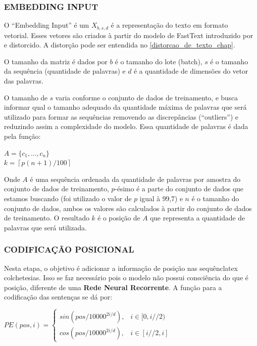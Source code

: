 \subsubsection{EMBEDDING INPUT}

O “Embedding Input” é um \textbf{$X_{b,s,d}$} é a representação do texto em formato vetorial. Esses vetores são criados à partir do modelo de FastText introduzido por \cite{fasttext} e distorcido. A distorção pode ser entendida no \autoref{distorcao_de_texto_chap}.

O tamanho da matriz é dados por \textbf{$b$} é o tamanho do lote (batch), \textbf{$s$} é o tamanho da sequência (quantidade de palavras) e \textbf{$d$} é a quantidade de dimensões do vetor das palavras.

O tamanho de \textbf{$s$} varia conforme o conjunto de dados de treinamento, e busca informar qual o tamanho adequado da quantidade máxima de palavras que será utilizado para formar as sequências removendo as discrepâncias (“outliers”) e reduzindo assim a complexidade do modelo. Essa quantidade de palavras é dada pela função:

\begin{center}
    $A = \{c_1, ..., c_n\}$ \\
    $k = \left \lceil p(n+1) / 100 \right \rceil$
\end{center}

Onde $A$ é uma sequência ordenada da quantidade de palavras por amostra do conjunto de dados de treinamento, $p$-ésimo é a parte  do conjunto de dados que estamos buscando (foi utilizado o valor de $p$ igual à 99,7) e $n$ é o tamanho do conjunto de dados, ambos os valores são calculados à partir do conjunto de dados de treinamento. O resultado $k$ é o posição de $A$ que representa a quantidade de palavras que será utilizada.

\subsubsection{CODIFICAÇÃO POSICIONAL}

Nesta etapa, o objetivo é adicionar a informação de posição nas sequênclatex colchetesias. Isso se faz necessário pois o modelo não possui consciência do que é posição, diferente de uma \textbf{Rede Neural Recorrente}. A função para a codificação das sentenças se dá por:

\begin{center}
$PE(pos, i) = \begin{cases}
sin(pos / 10000^{2i/d}), & i \in [0, i // 2) \\
cos(pos / 10000^{2i/d}), & i \in [i // 2, i]
\end{cases}$
\end{center}

